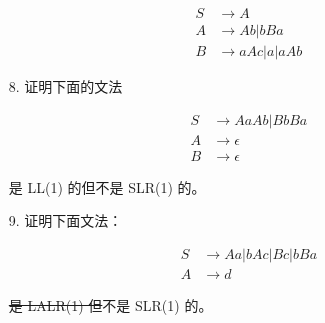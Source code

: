 \begin{enumerate}
    \begin{align*}
        S & \to A \\
        A & \to Ab | bBa \\
        B & \to aAc | a | aAb
    \end{align*}
    
    \item[8.] 证明下面的文法
    
    \begin{align*}
        S & \to AaAb | BbBa \\
        A & \to \epsilon \\
        B & \to \epsilon
    \end{align*}
    
    是 LL(1) 的但不是 SLR(1) 的。
    
    \item[9.] 证明下面文法：
    
    \begin{align*}
        S & \to Aa | bAc | Bc | bBa \\
        A & \to d
    \end{align*}
    
    \sout{是 LALR(1) 但}不是 SLR(1) 的。
    
\end{enumerate}